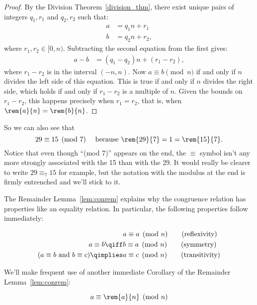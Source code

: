 \begin{proof}
By the Division Theorem~\ref{division_thm}, there exist unique pairs of integers $q_1, r_1$
and $q_2, r_2$ such that:
\begin{align*}
a & = q_1 n + r_1\\ b & = q_2 n + r_2,
\end{align*}
where $r_1,r_2 \in [0,n)$.  Subtracting the second equation from the first gives:
\begin{align*}
a - b & = (q_1 - q_2) n + (r_1 - r_2),
\end{align*}
where $r_1 - r_2$ is in the interval $(-n,n)$.  Now $a \equiv b \pmod{n}$ if and only if
$n$ divides the left side of this equation.  This is true if and only if $n$ divides the
right side, which holds if and only if $r_1 - r_2$ is a multiple of $n$.  Given the bounds
on $r_1 - r_2$, this happens precisely when $r_1 = r_2$, that is, when $\rem{a}{n} =
\rem{b}{n}$.
\end{proof}

So we can also see that
\[
29 \equiv 15 \pmod{7} \quad\text{ because } \rem{29}{7} = 1 = \rem{15}{7}.
\]
Notice that even though ``(mod 7)'' appears on the end, the $\equiv$ symbol isn't any more
strongly associated with the 15 than with the 29.  It would really be clearer to write $29
\equiv_7 15$ for example, but the notation with the modulus at the end is firmly entrenched
and we'll stick to it.

The Remainder Lemma~\ref{lem:conrem} explains why the congruence relation has properties
like an equality relation.  In particular, the following properties follow immediately:
\begin{lemma}\label{mod_equiv_rel_lem} \mbox{}
\begin{align}
                  & a \equiv a \pmod{n}\tag{reflexivity}\\ a \equiv b \qiff & b \equiv a
  \pmod{n} \tag{symmetry}\\ (a \equiv b \text{ and } b \equiv c) \qimplies & a \equiv c
  \pmod{n} \tag{transitivity}
\end{align}
\end{lemma}


We'll make frequent use of another immediate Corollary of the Remainder
Lemma~\ref{lem:conrem}:
\begin{corollary}\label{aran}
\[
a \equiv \rem{a}{n} \pmod{n}
\]
\end{corollary}

